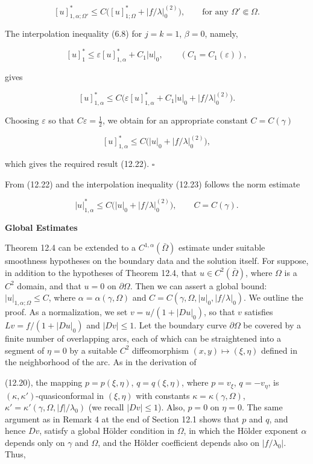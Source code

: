 \[
[u]^*_{1,\alpha;\Omega'} \le C\bigl([u]^*_{1;\Omega} + |f/\lambda|_0^{(2)}\bigr), \qquad \text{for any } \Omega' \Subset \Omega.
\]

The interpolation inequality (6.8) for $j = k = 1$, $\beta = 0$, namely,

\begin{equation}
\tag{12.23}
[u]^*_{1} \le \varepsilon [u]^*_{1,\alpha} + C_1 |u|_0, \qquad (C_1 = C_1(\varepsilon)),
\end{equation}

gives

\[
[u]^*_{1,\alpha} \le C\bigl(\varepsilon [u]^*_{1,\alpha} + C_1 |u|_0 + |f/\lambda|_0^{(2)}\bigr).
\]

Choosing $\varepsilon$ so that $C\varepsilon = \frac{1}{2}$, we obtain for an appropriate constant $C = C(\gamma)$

\[
[u]^*_{1,\alpha} \le C\bigl(|u|_0 + |f/\lambda|_0^{(2)}\bigr),
\]

which gives the required result (12.22). \(\square\)

From (12.22) and the interpolation inequality (12.23) follows the norm estimate

\begin{equation}
\tag{12.24}
|u|^*_{1,\alpha} \le C\bigl(|u|_0 + |f/\lambda|_0^{(2)}\bigr), \qquad C = C(\gamma).
\end{equation}

\textbf{Global Estimates}

Theorem 12.4 can be extended to a $C^{1,\alpha}(\bar{\Omega})$ estimate under suitable smoothness hypotheses on the boundary data and the solution itself. For suppose, in addition to the hypotheses of Theorem 12.4, that $u \in C^2(\bar{\Omega})$, where $\Omega$ is a $C^2$ domain, and that $u = 0$ on $\partial \Omega$. Then we can assert a global bound: $|u|_{1,\alpha;\Omega} \le C$, where $\alpha = \alpha(\gamma,\Omega)$ and $C = C(\gamma,\Omega, |u|_0, |f/\lambda|_0)$. We outline the proof. As a normalization, we set $v = u/(1 + |Du|_0)$, so that $v$ satisfies $Lv = f/(1 + |Du|_0)$ and $|Dv| \le 1$. Let the boundary curve $\partial \Omega$ be covered by a finite number of overlapping arcs, each of which can be straightened into a segment of $\eta = 0$ by a suitable $C^2$ diffeomorphism $(x,y) \mapsto (\xi,\eta)$ defined in the neighborhood of the arc. As in the derivation of



(12.20), the mapping $p=p(\xi,\eta)$, $q=q(\xi,\eta)$, where $p=v_{\xi}$, $q=-v_{\eta}$, is $(\kappa,\kappa')$-quasiconformal in $(\xi,\eta)$ with constants $\kappa=\kappa(\gamma,\Omega)$, $\kappa'=\kappa'(\gamma,\Omega,|f|/\lambda_0)$ (we recall $|Dv|\leq 1$). Also, $p=0$ on $\eta=0$. The same argument as in Remark 4 at the end of Section 12.1 shows that $p$ and $q$, and hence $Dv$, satisfy a global Hölder condition in $\Omega$, in which the Hölder exponent $\alpha$ depends only on $\gamma$ and $\Omega$, and the Hölder coefficient depends also on $|f/\lambda_0|$. Thus,

